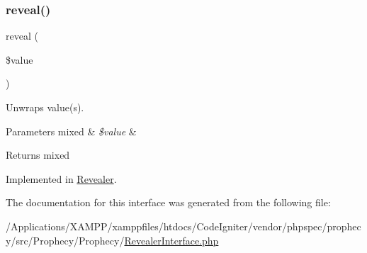 \subsubsection{\texorpdfstring{reveal()}{reveal()}}
{\footnotesize\ttfamily reveal (\begin{DoxyParamCaption}\item[{}]{\$value }\end{DoxyParamCaption})}

Unwraps value(s).


\begin{DoxyParams}[1]{Parameters}
mixed & {\em \$value} & \\
\hline
\end{DoxyParams}
\begin{DoxyReturn}{Returns}
mixed 
\end{DoxyReturn}


Implemented in \mbox{\hyperlink{class_prophecy_1_1_prophecy_1_1_revealer_a2164ede43027e2eff4dc1419222839f5}{Revealer}}.



The documentation for this interface was generated from the following file\+:\begin{DoxyCompactItemize}
\item 
/\+Applications/\+X\+A\+M\+P\+P/xamppfiles/htdocs/\+Code\+Igniter/vendor/phpspec/prophecy/src/\+Prophecy/\+Prophecy/\mbox{\hyperlink{_revealer_interface_8php}{Revealer\+Interface.\+php}}\end{DoxyCompactItemize}
